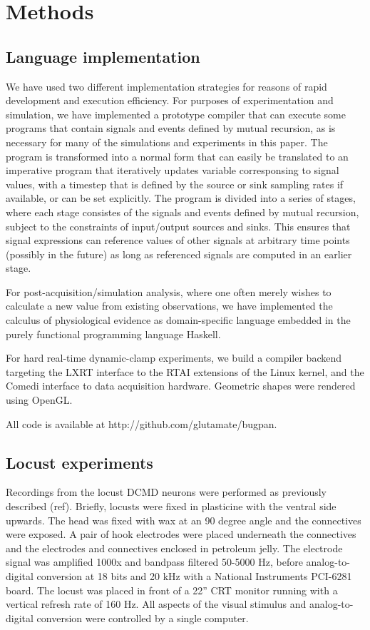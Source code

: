 \section*{Methods}

\subsection*{Language implementation} 

We have used two different implementation strategies for reasons of
rapid development and execution efficiency. For purposes of
experimentation and simulation, we have implemented a prototype
compiler that can execute some programs that contain signals and
events defined by mutual recursion, as is necessary for many of the
simulations and experiments in this paper. The program is transformed
into a normal form that can easily be translated to an imperative
program that iteratively updates variable corresponsing to signal
values, with a timestep that is defined by the source or sink sampling
rates if available, or can be set explicitly. The program is divided
into a series of stages, where each stage consistes of the signals and
events defined by mutual recursion, subject to the constraints of
input/output sources and sinks. This ensures that signal expressions
can reference values of other signals at arbitrary time points
(possibly in the future) as long as referenced signals are computed in
an earlier stage.

For post-acquisition/simulation analysis, where one often merely
wishes to calculate a new value from existing observations, we have
implemented the calculus of physiological evidence as domain-specific
language embedded in the purely functional programming language
Haskell.

For hard real-time dynamic-clamp experiments, we build a compiler
backend targeting the LXRT interface to the RTAI extensions of the
Linux kernel, and the Comedi interface to data acquisition
hardware. Geometric shapes were rendered using OpenGL.

All code is available at http://github.com/glutamate/bugpan.

\subsection*{Locust experiments}

Recordings from the locust DCMD neurons were performed as previously
described (ref). Briefly, locusts were fixed in plasticine with the
ventral side upwards. The head was fixed with wax at an 90 degree
angle and the connectives were exposed. A pair of hook electrodes were
placed underneath the connectives and the electrodes and connectives
enclosed in petroleum jelly. The electrode signal was amplified 1000x
and bandpass filtered 50-5000 Hz, before analog-to-digital conversion
at 18 bits and 20 kHz with a National Instruments PCI-6281 board. The
locust was placed in front of a 22'' CRT monitor running with a
vertical refresh rate of 160 Hz. All aspects of the visual stimulus
and analog-to-digital conversion were controlled by a single computer.

